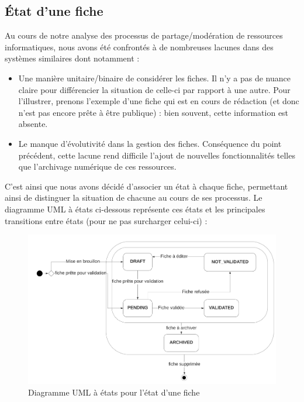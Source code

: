 \pagebreak

\subsection*{État d'une fiche}

Au cours de notre analyse des processus de partage/modération de ressources informatiques, nous avons été confrontés à de nombreuses lacunes dans des systèmes similaires dont notamment :
\begin{itemize}
    \item Une manière unitaire/binaire de considérer les fiches. Il n'y a pas de nuance claire pour différencier la situation de celle-ci par rapport à une autre. Pour l'illustrer, prenons l'exemple d'une fiche qui est en cours de rédaction (et donc n'est pas encore prête à être publique) : bien souvent, cette information est absente.
    \item Le manque d'évolutivité dans la gestion des fiches. Conséquence du point précédent, cette lacune rend difficile l'ajout de nouvelles fonctionnalités telles que l'archivage numérique de ces ressources. 
\end{itemize}

C'est ainsi que nous avons décidé d'associer un état à chaque fiche, permettant ainsi de distinguer la situation de chacune au cours de ses processus. Le diagramme UML à états ci-dessous représente ces états et les principales transitions entre états (pour ne pas surcharger celui-ci) :

\begin{figure}[H]
    \includegraphics[width=\textwidth,height=\textheight,keepaspectratio]{images/StateFiches.png}
    \centering
    \caption{Diagramme UML à états pour l'état d'une fiche}
    \label{pic:stateDiagramForFiches}
\end{figure}


